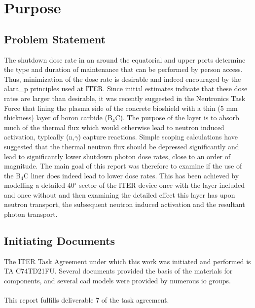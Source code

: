 \documentclass[12pt]{article}
\begin{document}
\newpage
\clearpage
\glsresetall
\setcounter{section}{0}

\renewcommand*{\theHsection}{\Alph{section}}

\section{Purpose}
\subsection{Problem Statement}
The shutdown dose rate in an around the equatorial and upper ports determine the
type and duration of maintenance that can be performed by person access. Thus,
minimization of the dose rate is desirable and indeed encouraged by the 
\gls{alara_p} principles used at ITER. Since initial estimates indicate that
these dose rates are larger than desirable, it was recently suggested in the 
Neutronics Task Force that lining the plasma side of the concrete bioshield 
with a thin (5 mm thickness) layer of boron carbide (B$_4$C). The purpose 
of the layer is to absorb much of the thermal flux which would otherwise lead 
to neutron induced activation, typically (n,$\gamma$) capture reactions. Simple 
scoping calculations have suggested that the thermal neutron flux should be 
depressed significantly and lead to significantly lower shutdown photon dose 
rates, close to an order of magnitude. The main goal of this report was 
therefore to examine if the use of the B$_4$C liner does indeed lead to lower 
dose rates.  This has been achieved by modelling a detailed 40$^{\circ}$ sector 
of the ITER device once with the layer included and once without and then 
examining the detailed effect this layer has upon neutron transport, the 
subsequent neutron induced activation and the resultant photon transport.

\subsection{Initiating Documents}
The ITER Task Agreement under which this work was initiated and performed is TA
C74TD21FU. Several documents provided the basis of the materials for components,
and several \gls{cad} models were provided by numerous \gls{io} groups.
\\
\\
This report fulfills deliverable 7 of the task agreement.
\end{document}
